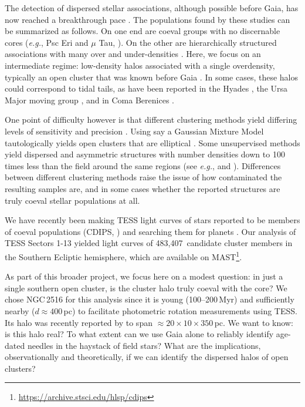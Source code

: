 \documentclass[12pt,twocolumn,tighten]{aastex63}
\newcommand{\numsouthernuniqlcs}{483{,}407} %
\begin{document}
The detection of dispersed stellar associations, although possible
before Gaia, has now reached a breakthrough pace \citep[{\it
e.g.},][]{de_zeeuw_hipparcos_1999,bergond_gravitational_2001,zuckerman_young_2004,oh_comoving_2017,cantatgaudin_gaia_2018,gagne_banyan_XII_2018,gagne_banyan_XIII_2018,kounkel_apogee2_2018,zari_3d_2018,kounkel_untangling_2019,furnkranz_comabernbhr_2019}.
The populations found by these studies can be summarized as follows.
On one end are coeval groups with no discernable cores ({\it e.g.},
Psc Eri and $\mu$ Tau,
\citealt{meingast_psceri_2019,curtis_tess_2019,gagne_mutau_2020}).  On
the other are hierarchically structured associations with many over
and under-densities  \citep[{\it e.g.} the Sco-Cen and Vela
associations,][]{pecaut_star_2016,cantatgaudin_velaOB2_2019}.  Here, we
focus on an intermediate regime: low-density halos associated with a
single overdensity, typically an open cluster that was known before
Gaia
\citep[see][]{kounkel_untangling_2019,kounkel_untanglingII_2020,meingast_2021}.
In some cases, these halos could correspond to tidal tails, as have
been reported in the Hyades
\citep{meingast_hyades_2019,roser_hyades_2019}, the Ursa Major moving
group \citep{gagne_lowmassUMA_2020}, and in Coma Berenices
\citep{tang_comaber_2019}. 

One point of difficulty however is that different clustering methods
yield differing levels of sensitivity and precision
\citep{hunt_clustering_2020}.  Using say a Gaussian Mixture Model
tautologically yields open clusters that are elliptical \citep[{\it
e.g.},][]{wallace_m4_2018}.  Some unsupervised methods yield dispersed
and asymmetric structures with number densities down to 100 times less
than the field around the same regions (see {\it e.g.},
\citealt{kounkel_untangling_2019} and \citealt{meingast_2021}).
Differences between different clustering methods raise the issue of
how contaminated the resulting samples are, and in some cases whether
the reported structures are truly coeval stellar populations at all.

We have recently been making TESS light curves of stars reported to be
members of coeval populations (CDIPS, \citealt{bouma_cdipsI_2019}) and
searching them for planets \citep{bouma_cluster_2020}.
Our analysis of TESS Sectors 1-13 yielded light curves of
\numsouthernuniqlcs\ candidate cluster members in the Southern
Ecliptic hemisphere, which are available on
MAST\footnote{\url{https://archive.stsci.edu/hlsp/cdips}}.

As part of this broader project, we focus here on a modest question:
in just a single southern open cluster, is the cluster halo truly
coeval with the core?  We chose NGC\,2516 for this analysis since it
is young (100--200\,Myr) and sufficiently nearby ($d\approx400$\,pc)
to facilitate photometric rotation measurements using TESS.  Its halo
was recently reported by \citet{kounkel_untangling_2019} to span
$\approx20\times10\times350$\,pc.  We want to know: is this halo real?
To what extent can we use Gaia alone to reliably identify age-dated
needles in the haystack of field stars?  What are the implications,
observationally and theoretically, if we can identify the dispersed
halos of open clusters?
\end{document}
